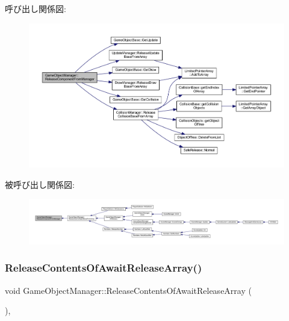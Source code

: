 呼び出し関係図\+:
\nopagebreak
\begin{figure}[H]
\begin{center}
\leavevmode
\includegraphics[width=350pt]{class_game_object_manager_a3435fd94a3a7b9eb69f422e33848137a_cgraph}
\end{center}
\end{figure}
被呼び出し関係図\+:
\nopagebreak
\begin{figure}[H]
\begin{center}
\leavevmode
\includegraphics[width=350pt]{class_game_object_manager_a3435fd94a3a7b9eb69f422e33848137a_icgraph}
\end{center}
\end{figure}
\mbox{\label{class_game_object_manager_a5a6c1208229decd93c6ef396bce35b3a}} 
\subsubsection{\texorpdfstring{Release\+Contents\+Of\+Await\+Release\+Array()}{ReleaseContentsOfAwaitReleaseArray()}}
{\footnotesize\ttfamily void Game\+Object\+Manager\+::\+Release\+Contents\+Of\+Await\+Release\+Array (\begin{DoxyParamCaption}{ }\end{DoxyParamCaption})\hspace{0.3cm}{\ttfamily [static]}, {\ttfamily [private]}}



